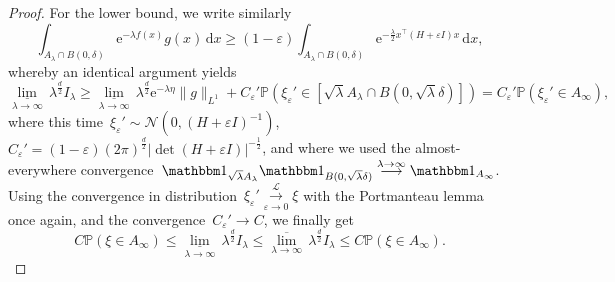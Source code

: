 \documentclass[10pt]{article}
\newcommand{\cL}{\mathcal{L}}
\renewcommand{\d}{\mathrm{d}}
\newcommand{\e}{\mathrm{e}}
\renewcommand{\P}{\mathbb{P}}
\newcommand{\R}{\mathbb{R}}
\newcommand{\1}{\mathbbm 1}
\newtheorem{theorem}{Theorem}
\begin{document}
\begin{proof}
        For the lower bound, we write similarly
        \[\int_{A_\lambda \cap B(0,\delta)} \e^{-\lambda f(x)}g(x)\,\d x\geq (1-\varepsilon)\int_{A_\lambda \cap B(0,\delta)}\e^{-\frac\lambda2x^\intercal(H+\varepsilon I)x}\,\d x,\]
        whereby an identical argument yields
        \[ \underset{\lambda\to\infty}{\underline\lim}\,\lambda^{\frac d2}I_\lambda \geq \underset{\lambda\to\infty}{\underline\lim}\,\lambda^{\frac d2}\e^{-\lambda\eta}\|g\|_{L^1} + C_\varepsilon'\P\left(\xi_\varepsilon' \in \left[\sqrt\lambda A_\lambda \cap B(0,\sqrt\lambda\delta)\right]\right)= C_\varepsilon'\P(\xi_\varepsilon'\in A_\infty),\]
        where this time~$\xi_\varepsilon' \sim \mathcal N(0,(H+\varepsilon I)^{-1})$,~$ C_\varepsilon ' = (1-\varepsilon) (2\pi)^{\frac d2} |\det (H+\varepsilon I)|^{-\frac 12}$, and where we used the almost-everywhere convergence~$\mathbbm 1_{\sqrt \lambda A_\lambda} \mathbbm 1_{B(0,\sqrt \lambda \delta)} \overset{\lambda\to \infty}{\longrightarrow} \mathbbm 1_{A_\infty}$.
        Using the convergence in distribution~$\xi_\varepsilon' \overset{\cL}{\underset{\varepsilon\to 0}{\longrightarrow}}\xi$ with the Portmanteau lemma once again, and the convergence~$C_\varepsilon'\to C$, we finally get
        \[C \P(\xi\in A_\infty) \leq \underset{\lambda\to\infty}{\underline\lim}\,\lambda^{\frac d2}I_\lambda\leq \underset{\lambda\to\infty}{\overline\lim}\,\lambda^{\frac d2}I_\lambda \leq C \P(\xi\in A_\infty).\]
    \end{proof}


        

\end{document}

